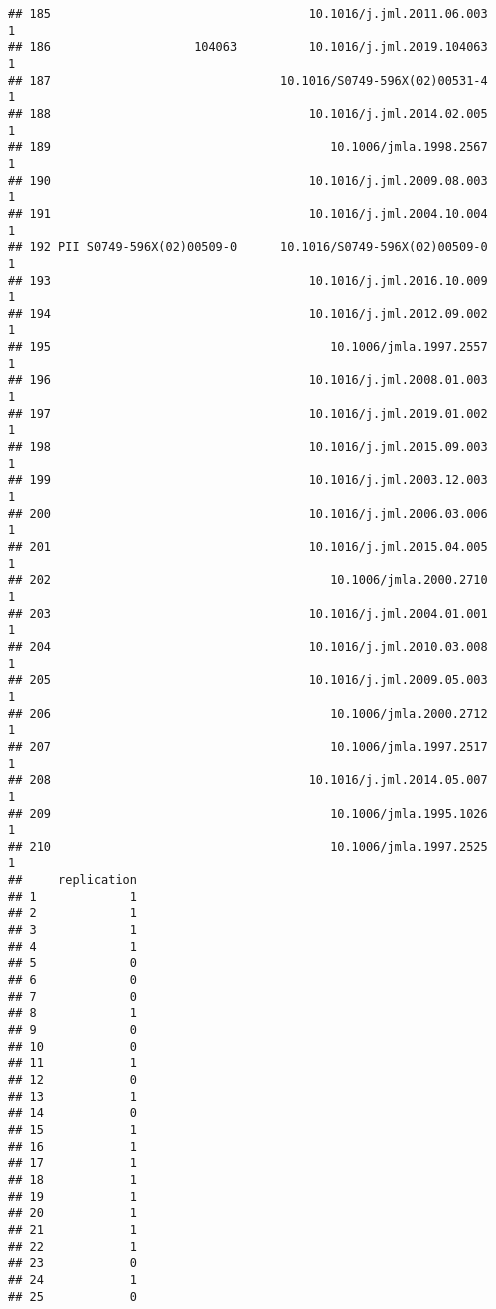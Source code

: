 \documentclass[
  english,
  man]{apa6}
\begin{document}
\begin{verbatim}
## 185                                    10.1016/j.jml.2011.06.003            1
## 186                    104063          10.1016/j.jml.2019.104063            1
## 187                                10.1016/S0749-596X(02)00531-4            1
## 188                                    10.1016/j.jml.2014.02.005            1
## 189                                       10.1006/jmla.1998.2567            1
## 190                                    10.1016/j.jml.2009.08.003            1
## 191                                    10.1016/j.jml.2004.10.004            1
## 192 PII S0749-596X(02)00509-0      10.1016/S0749-596X(02)00509-0            1
## 193                                    10.1016/j.jml.2016.10.009            1
## 194                                    10.1016/j.jml.2012.09.002            1
## 195                                       10.1006/jmla.1997.2557            1
## 196                                    10.1016/j.jml.2008.01.003            1
## 197                                    10.1016/j.jml.2019.01.002            1
## 198                                    10.1016/j.jml.2015.09.003            1
## 199                                    10.1016/j.jml.2003.12.003            1
## 200                                    10.1016/j.jml.2006.03.006            1
## 201                                    10.1016/j.jml.2015.04.005            1
## 202                                       10.1006/jmla.2000.2710            1
## 203                                    10.1016/j.jml.2004.01.001            1
## 204                                    10.1016/j.jml.2010.03.008            1
## 205                                    10.1016/j.jml.2009.05.003            1
## 206                                       10.1006/jmla.2000.2712            1
## 207                                       10.1006/jmla.1997.2517            1
## 208                                    10.1016/j.jml.2014.05.007            1
## 209                                       10.1006/jmla.1995.1026            1
## 210                                       10.1006/jmla.1997.2525            1
##     replication
## 1             1
## 2             1
## 3             1
## 4             1
## 5             0
## 6             0
## 7             0
## 8             1
## 9             0
## 10            0
## 11            1
## 12            0
## 13            1
## 14            0
## 15            1
## 16            1
## 17            1
## 18            1
## 19            1
## 20            1
## 21            1
## 22            1
## 23            0
## 24            1
## 25            0

\end{verbatim}
\end{document}
